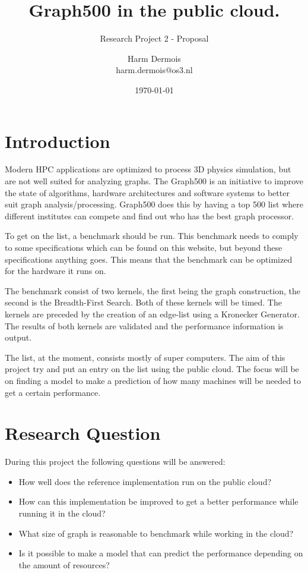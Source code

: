 \documentclass[A4]{scrartcl}
\begin{document}
\title{Graph500 in the public cloud.}
\subtitle{Research Project 2 - Proposal}
\date{\today}
\author{Harm Dermois \\ harm.dermois@os3.nl}

\maketitle

\section*{Introduction}
\label{sec:introduction}
Modern HPC applications are optimized to process 3D physics simulation, but are not well suited for analyzing graphs. The Graph500 \cite{murphy2010introducing} is an initiative to improve the state of algorithms, hardware architectures and software systems to better suit graph analysis/processing. Graph500 does this by having a top 500 list where different institutes can compete and find out who has the best graph processor.

To get on the list, a benchmark should be run. This benchmark needs to comply to some specifications which can be found on this website\cite{graph500-specs}, but beyond these specifications anything goes. This means that the benchmark can be optimized for the hardware it runs on. 

The benchmark consist of two kernels, the first being the graph construction, the second is the Breadth-First Search. Both of these kernels will be timed. The kernels are preceded by the creation of an edge-list using a Kronecker Generator\cite{leskovec2010kronecker}. The results of both kernels are validated and the performance information is output. 

The list, at the moment, consists mostly of super computers. The aim of this project try and put an entry on the list using the public cloud. The focus will be on finding a model to make a prediction of how many machines will be needed to get a certain performance.

\section*{Research Question}
During this project the following questions will be answered:
\begin{itemize}
\item How well does the reference implementation\cite{graph500-code} run on the public cloud?
\item How can this implementation be improved to get a better performance while running it in the cloud?
\item What size of graph is reasonable to benchmark while working in the cloud?
\item Is it possible to make a model that can predict the performance depending on the amount of resources?
\end{itemize}
\end{document}
